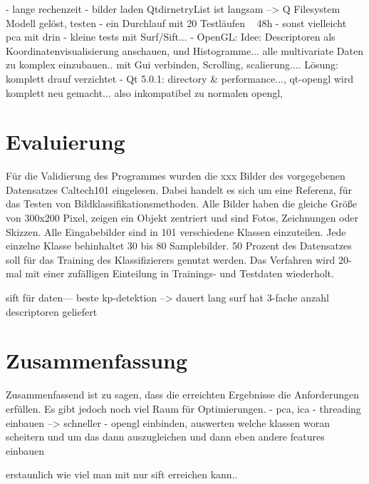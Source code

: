 \documentclass[liststotoc,11pt,a4paper]{article}
\begin{document}
- lange rechenzeit - bilder laden QtdirnetryList ist langsam --> Q Filesystem Modell gelöst, testen
- ein Durchlauf mit 20 Testläufen ~ 48h 
- sonst vielleicht pca mit drin
- kleine tests mit Surf/Sift...
- OpenGL: Idee: Descriptoren als Koordinatenvisualisierung anschauen, und Histogramme... alle multivariate Daten
zu komplex einzubauen.. mit Gui verbinden, Scrolling, scalierung.... 
Lösung: komplett drauf verzichtet
- Qt 5.0.1: directory & performance..., qt-opengl wird komplett neu gemacht... also inkompatibel zu normalen opengl,

\section{Evaluierung}
Für die Validierung des Programmes wurden die xxx Bilder des vorgegebenen Datensatzes Caltech101 eingelesen. Dabei handelt es sich um eine Referenz, für das Testen von Bildklassifikationsmethoden. Alle Bilder haben die gleiche Größe von 300x200 Pixel, zeigen ein Objekt zentriert und sind Fotos, Zeichnungen oder Skizzen. Alle Eingabebilder sind in 101 verschiedene Klassen einzuteilen. Jede einzelne Klasse behinhaltet 30 bis 80 Samplebilder. 
50 Prozent des Datensatzes soll für das Training des Klassifizierers genutzt werden. Das Verfahren wird 20-mal mit einer zufälligen Einteilung in Trainings- und Testdaten wiederholt.

sift für daten--- beste kp-detektion --> dauert lang
surf hat 3-fache anzahl descriptoren geliefert





\section{Zusammenfassung}
Zusammenfassend ist zu sagen, dass die erreichten Ergebnisse die Anforderungen erfüllen. Es gibt jedoch noch viel Raum für Optimierungen. 
- pca, ica
- threading einbauen --> schneller
- opengl einbinden, auswerten welche klassen woran scheitern und um das dann auszugleichen
 und dann eben andere features einbauen

erstaunlich wie viel man mit nur sift erreichen kann.. 



\newpage
{}
\setcounter{page}{3}
\renewcommand{\refname}{Referenzen}

\end{document}
